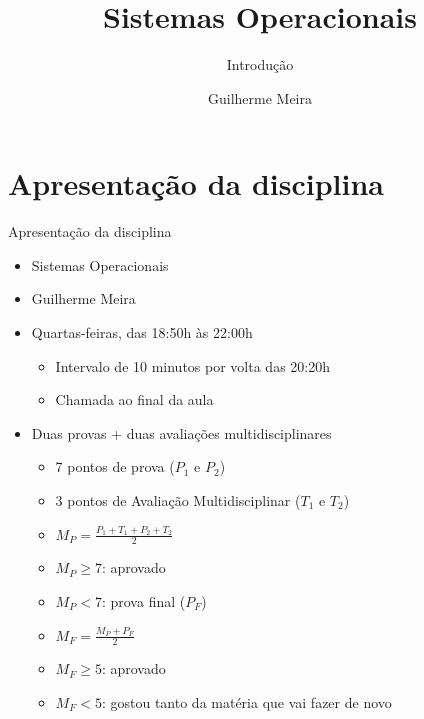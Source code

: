 \documentclass{beamer}
\title{Sistemas Operacionais} %
\subtitle{Introdução} %
\author{Guilherme Meira}
\begin{document}
  \frame{\maketitle}
  	
\section{Apresentação da disciplina}
\begin{frame}{Apresentação da disciplina}
   	\begin{itemize}
   		\item[Disciplina] Sistemas Operacionais
   		\item[Professor] Guilherme Meira
   		\item[Horário] Quartas-feiras, das 18:50h às 22:00h
   		\begin{itemize}
   			\item Intervalo de 10 minutos por volta das 20:20h
   			\item Chamada ao final da aula
   		\end{itemize}
   		\item[Avaliação] Duas provas + duas avaliações multidisciplinares
   		\begin{itemize}
   			\item 7 pontos de prova ($P_{1}$ e $P_{2}$)
   			\item 3 pontos de Avaliação Multidisciplinar ($T_{1}$ e $T_{2}$)
   			\item $M_{P} = \frac{P_{1} + T_{1} + P_{2} + T_{2}}{2}$
   			\item $M_{P} \ge 7$: aprovado
   			\item $M_{P} < 7$: prova final ($P_{F}$)
   			\item $M_{F} = \frac{M_{P} + P_{F}}{2}$
   			\item $M_{F} \ge 5$: aprovado
   			\item $M_{F} < 5$: gostou  tanto da matéria que vai fazer de novo
   		\end{itemize}
   	\end{itemize}
\end{frame}
\end{document}
